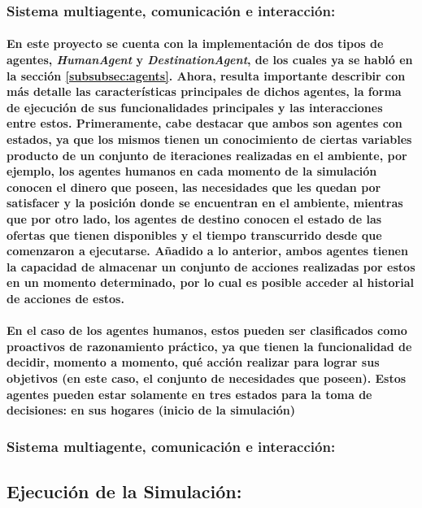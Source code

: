 \documentclass[12pt]{amsart}
\begin{document}
\subsubsection{Sistema multiagente, comunicación e interacción:}

\paragraph{En este proyecto se cuenta con la implementación de dos tipos de agentes, \textit{HumanAgent} y \textit{DestinationAgent}, de los cuales ya se habló en la sección \ref{subsubsec:agents}. Ahora, resulta importante describir con más detalle las características principales de dichos agentes, la forma de ejecución de sus funcionalidades principales y las interacciones entre estos. Primeramente, cabe destacar que ambos son agentes con estados, ya que los mismos tienen un conocimiento de ciertas variables producto de un conjunto de iteraciones realizadas en el ambiente, por ejemplo, los agentes humanos en cada momento de la simulación conocen el dinero que poseen, las necesidades que les quedan por satisfacer y la posición donde se encuentran en el ambiente,  mientras que por otro lado, los agentes de destino conocen el estado de las ofertas que tienen disponibles y el tiempo transcurrido desde que comenzaron a ejecutarse. Añadido a lo anterior, ambos agentes tienen la capacidad de almacenar un conjunto de acciones realizadas por estos en un momento determinado, por lo cual es posible acceder al historial de acciones de estos.}

\paragraph{En el caso de los agentes humanos, estos pueden ser clasificados como proactivos de razonamiento práctico, ya que tienen la funcionalidad de decidir, momento a momento, qué acción realizar para lograr sus objetivos (en este caso, el conjunto de necesidades que poseen).  Estos agentes pueden estar solamente en tres estados para la toma de decisiones: en sus hogares (inicio de la simulación)}

\subsubsection{Sistema multiagente, comunicación e interacción:}

\subsection{Ejecución de la Simulación:}
\end{document}

